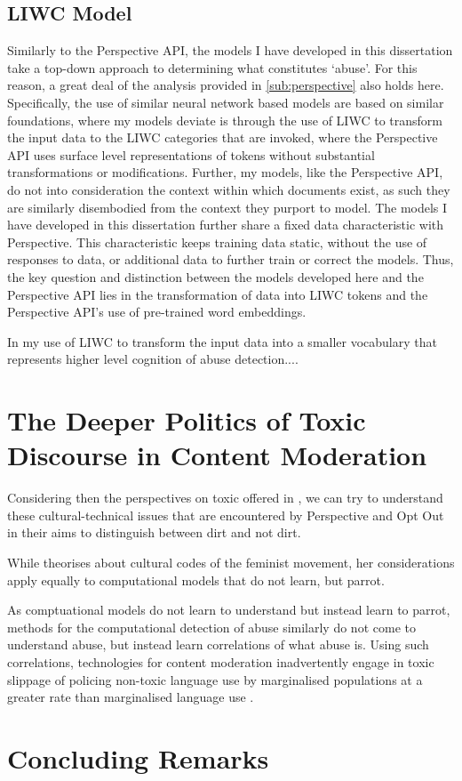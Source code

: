 \subsection{LIWC Model}

Similarly to the Perspective API, the models I have developed in this dissertation take a top-down approach to determining what constitutes `abuse'. For this reason, a great deal of the analysis provided in \autoref{sub:perspective} also holds here. Specifically, the use of similar neural network based models are based on similar foundations, where my models deviate is through the use of LIWC \cite{Tausczik:2001} to transform the input data to the LIWC categories that are invoked, where the Perspective API uses surface level representations of tokens without substantial transformations or modifications. Further, my models, like the Perspective API, do not into consideration the context within which documents exist, as such they are similarly disembodied from the context they purport to model. The models I have developed in this dissertation further share a fixed data characteristic with Perspective. This characteristic keeps training data static, without the use of responses to data, or additional data to further train or correct the models. Thus, the key question and distinction between the models developed here and the Perspective API lies in the transformation of data into LIWC tokens and the Perspective API's use of pre-trained word embeddings.

In my use of LIWC to transform the input data into a smaller vocabulary that represents higher level cognition of abuse detection....


\section{The Deeper Politics of Toxic Discourse in Content Moderation}

Considering then the perspectives on toxic offered in \cite{Risam:2015}, we can try to understand these cultural-technical issues that are encountered by Perspective and Opt Out in their aims to distinguish between dirt and not dirt.

While \citet{Rissam:2015} theorises about cultural codes of the feminist movement, her considerations apply equally to computational models that do not learn, but parrot\citep{Bender:2020}.

As comptuational models do not learn to understand \citep{Bender:2020} but instead learn to parrot, methods for the computational detection of abuse similarly do not come to understand abuse, but instead learn correlations of what abuse is. Using such correlations, technologies for content moderation inadvertently engage in toxic slippage of policing non-toxic language use by marginalised populations at a greater rate than marginalised language use \cite{Oliva:2020}.

\section{Concluding Remarks}

